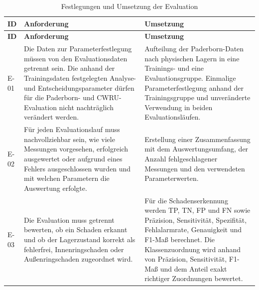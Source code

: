 \begingroup
\small
\setlength{\aboverulesep}{0pt}
\setlength{\belowrulesep}{0pt}
\setlength{\doublerulesep}{0pt}
\renewcommand{\arraystretch}{1.2}
\begin{longtable}{|
    >{\raggedright\arraybackslash}p{1.0cm}|
    >{\raggedright\arraybackslash}p{8.0cm}|
    >{\raggedright\arraybackslash}p{\dimexpr\textwidth-9.0cm-6\tabcolsep-4\arrayrulewidth\relax}|}
  \caption{Festlegungen und Umsetzung der Evaluation}
  \label{tab:anforderungen_evaluation} \\
    \hline
    \textbf{ID} & \textbf{Anforderung} & \textbf{Umsetzung} \\
    \toprule
    \toprule
    \endfirsthead
    \hline
    \textbf{ID} & \textbf{Anforderung} & \textbf{Umsetzung} \\
    \toprule
    \toprule
    \endhead
    \leavevmode\hypertarget{req:E-01}{E-01} & Die Daten zur Parameterfestlegung müssen von den Evaluationsdaten
    getrennt sein. Die anhand der Trainingsdaten festgelegten Analyse- und
    Entscheidungsparameter dürfen für die Paderborn- und CWRU-Evaluation nicht
    nachträglich verändert werden. &
    Aufteilung der Paderborn-Daten nach physischen Lagern in eine Trainings-
    und eine Evaluationsgruppe. Einmalige Parameterfestlegung anhand der
    Trainingsgruppe und unveränderte Verwendung in beiden Evaluationsläufen. \\
    \hline
    \leavevmode\hypertarget{req:E-02}{E-02} & Für jeden Evaluationslauf muss nachvollziehbar sein, wie viele
    Messungen vorgesehen, erfolgreich ausgewertet oder aufgrund eines Fehlers
    ausgeschlossen wurden und mit welchen Parametern die Auswertung erfolgte. &
    Erstellung einer Zusammenfassung mit dem Auswertungsumfang, der Anzahl
    fehlgeschlagener Messungen und den verwendeten Parameterwerten. \\
    \hline
    \leavevmode\hypertarget{req:E-03}{E-03} & Die Evaluation muss getrennt bewerten, ob ein Schaden erkannt und
    ob der Lagerzustand korrekt als fehlerfrei, Innenringschaden oder
    Außenringschaden zugeordnet wird. &
    Für die Schadenserkennung werden \gls{TP}, \gls{TN}, \gls{FP} und
    \gls{FN} sowie Präzision,
    Sensitivität, Spezifität, Fehlalarmrate, Genauigkeit und F1-Maß
    berechnet. Die Klassenzuordnung wird anhand von Präzision, Sensitivität,
    F1-Maß und dem Anteil exakt richtiger Zuordnungen bewertet. \\
    \hline
\end{longtable}
\endgroup
